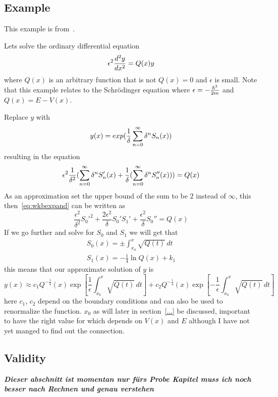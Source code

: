 \documentclass[11pt,DIV=10,final]{scrreprt} %
\begin{document}
\subsection{Example}
This example is from~\cite[An example]{wiki:wkb}.

Lets solve the ordinary differential equation
\[
  \epsilon^{2} {d^{2}y \over dx^{2}} = Q(x)y
\]
where $Q(x)$ is an arbitrary function that is not $Q(x) = 0$ and $\epsilon$ is small. Note that this example relates to the Schrödinger equation
where $\epsilon = -{\hbar^{2} \over 2m}$ and $Q(x) = E - V(x)$.

Replace $y$ with
\[
  y(x) = exp({1 \over \delta} \sum_{n=0}^{\infty}{\delta^{n}S_{n}(x)})
\]
resulting in the equation
\begin{equation}
\label{eq:wkbexpand}
  \epsilon^{2}{1 \over \delta^{2}}(\sum_{n=0}^{\infty}{\delta^{n}S'_{n}(x)} + {1 \over \delta}(\sum_{n=0}^{\infty}{\delta^{n}S''_{n}(x)})) = Q(x)
\end{equation}
As an approximation set the upper bound of the sum to be $2$ instead of $\infty$, this then~\ref{eq:wkbexpand} can be written as
\begin{equation}
\label{eq:wkbapprox}
 \frac{\epsilon^2}{\delta^2}S_0'^2 + \frac{2\epsilon^2}{\delta}S_0'S_1' + \frac{\epsilon^2}{\delta}S_0'' = Q(x)
\end{equation}
If we go further and solve for $S_{0}$ and $S_{1}$ we will get that
\begin{align}
	S_0(x) = \pm \int_{x_0}^x \sqrt{Q(t)}\,dt \\
	S_1(x) = -\frac{1}{4}\ln Q(x) + k_1
\end{align}
this means that our approximate solution of $y$ is
\[
y(x)\approx c_{1}Q^{-{\frac {1}{4}}}(x)\exp \left[{\frac {1}{\epsilon }}\int _{x_{0}}^{x}{\sqrt {Q(t)}}\,dt\right]+c_{2}Q^{-{\frac {1}{4}}}(x)\exp \left[-{\frac {1}{\epsilon }}\int _{x_{0}}^{x}{\sqrt {Q(t)}}\,dt\right]
\]
here $c_{1}$, $c_{2}$ depend on the boundary conditions and can also be used to renormalize the function. $x_{0}$ as will later in section~\ref{...} be discussed, important to have the right value for which depends on $V(x)$ and $E$ although I have not yet manged to find out the connection.

\subsection{Validity}
\label{meth:wkb:valid}
\textit{\textbf{Dieser abschnitt ist momentan nur fürs Probe Kapitel muss ich noch besser nach Rechnen und genau verstehen}}
\end{document}
